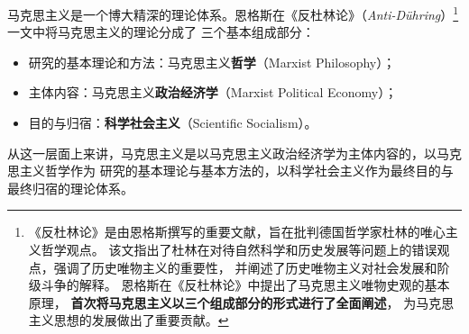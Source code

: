 \documentclass[10pt, UTF8]{book} %
\begin{document}
马克思主义是一个博大精深的理论体系。恩格斯在《反杜林论》（{\itshape Anti-Dühring}）\footnote{
    《反杜林论》是由恩格斯撰写的重要文献，旨在批判德国哲学家杜林的唯心主义哲学观点。
    该文指出了杜林在对待自然科学和历史发展等问题上的错误观点，强调了历史唯物主义的重要性，
    并阐述了历史唯物主义对社会发展和阶级斗争的解释。
    恩格斯在《反杜林论》中提出了马克思主义唯物史观的基本原理，
    \textbf{首次将马克思主义以三个组成部分的形式进行了全面阐述}，
    为马克思主义思想的发展做出了重要贡献。
}一文中将马克思主义的理论分成了
三个基本组成部分：
\begin{itemize}[itemsep=0pt]
    \item 研究的基本理论和方法：马克思主义\textbf{哲学}（Marxist Philosophy）；
    \item 主体内容：马克思主义\textbf{政治经济学}（Marxist Political Economy）；
    \item 目的与归宿：\textbf{科学社会主义}（Scientific Socialism）。
\end{itemize}
从这一层面上来讲，马克思主义是以马克思主义政治经济学为主体内容的，以马克思主义哲学作为
研究的基本理论与基本方法的，以科学社会主义作为最终目的与最终归宿的理论体系。
\end{document}
